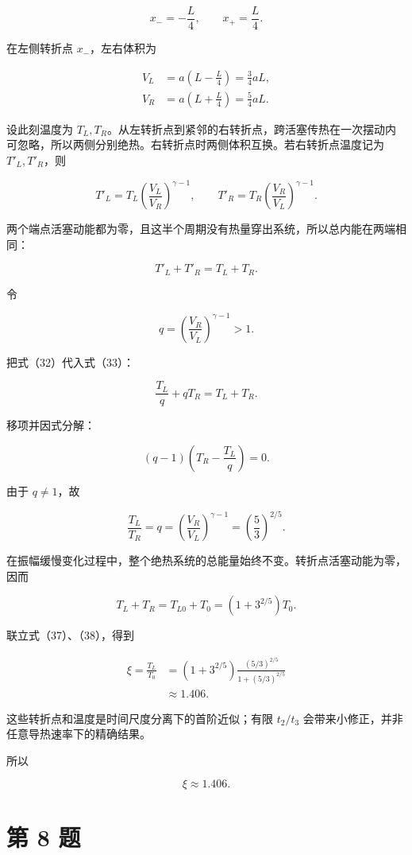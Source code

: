 \documentclass[12pt,a4paper,UTF8]{ctexart}
\begin{document}
\[
x_-=-\frac L4,\qquad x_+=\frac L4. \tag{30}
\]

在左侧转折点 \(x_-\)，左右体积为

\[
\begin{aligned}
V_L&=a\left(L-\frac L4\right)=\frac34aL,\\
V_R&=a\left(L+\frac L4\right)=\frac54aL.
\end{aligned} \tag{31}
\]

设此刻温度为
\(T_L,T_R\)。从左转折点到紧邻的右转折点，跨活塞传热在一次摆动内可忽略，所以两侧分别绝热。右转折点时两侧体积互换。若右转折点温度记为
\(T'_L,T'_R\)，则

\[
T'_L=T_L\left(\frac{V_L}{V_R}\right)^{\gamma-1},
\qquad
T'_R=T_R\left(\frac{V_R}{V_L}\right)^{\gamma-1}. \tag{32}
\]

两个端点活塞动能都为零，且这半个周期没有热量穿出系统，所以总内能在两端相同：

\[
T'_L+T'_R=T_L+T_R. \tag{33}
\]

令

\[
q=\left(\frac{V_R}{V_L}\right)^{\gamma-1}>1. \tag{34}
\]

把式（32）代入式（33）：

\[
\frac{T_L}{q}+qT_R=T_L+T_R. \tag{35}
\]

移项并因式分解：

\[
(q-1)\left(T_R-\frac{T_L}{q}\right)=0. \tag{36}
\]

由于 \(q\ne1\)，故

\[
\frac{T_L}{T_R}=q
=\left(\frac{V_R}{V_L}\right)^{\gamma-1}
=\left(\frac53\right)^{2/5}. \tag{37}
\]

在振幅缓慢变化过程中，整个绝热系统的总能量始终不变。转折点活塞动能为零，因而

\[
T_L+T_R=T_{L0}+T_0
=\left(1+3^{2/5}\right)T_0. \tag{38}
\]

联立式（37）、（38），得到

\[
\begin{aligned}
\xi
=\frac{T_L}{T_0}
&=\left(1+3^{2/5}\right)
\frac{(5/3)^{2/5}}{1+(5/3)^{2/5}}\\
&\approx1.406.
\end{aligned} \tag{39}
\]

这些转折点和温度是时间尺度分离下的首阶近似；有限 \(t_2/t_3\)
会带来小修正，并非任意导热速率下的精确结果。

所以

\[
\boxed{\xi\approx1.406}. \tag{40}
\]

\newpage

\section{第 8 题}\label{ux7b2c-8-ux9898}
\end{document}
